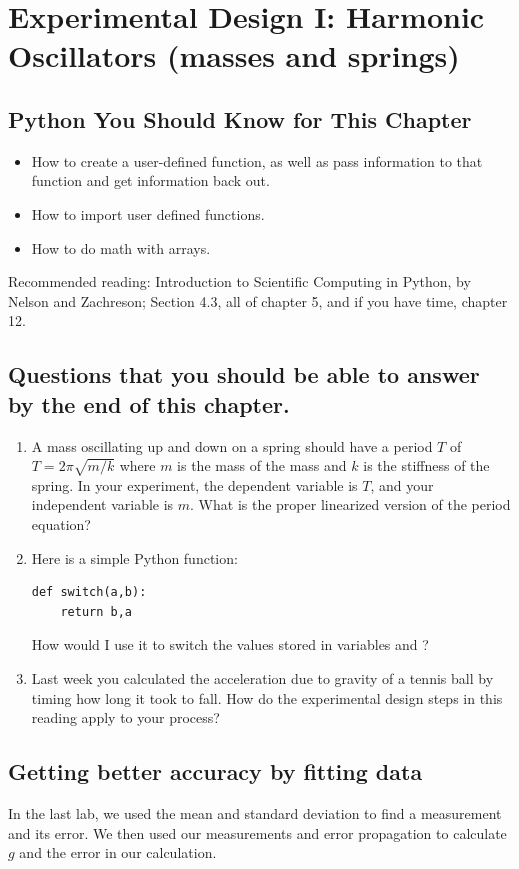 \documentclass[twoside,11pt,ShortChapTitles]{BYUTextbook}
\begin{document}
\chapter[Experimental Design I]{Experimental Design I: Harmonic Oscillators (masses and springs)\label{Experimental Design}}
\section*{Python You Should Know for This Chapter}
\begin{itemize}
\item How to create a user-defined function, as well as pass information to that function and get information back out.
\item How to import user defined functions.
\item How to do math with arrays.
\end{itemize}
Recommended reading: Introduction to Scientific Computing in Python, by Nelson and Zachreson; Section 4.3, all of chapter 5, and if you have time, chapter 12.
\section*{Questions that you should be able to answer by the end of this chapter.}
\begin{enumerate}
\item A mass oscillating up and down on a spring should have a period $T$ of $T=2\pi\sqrt{m/k}$ where $m$ is the mass of the mass and $k$ is the stiffness of the spring.  In your experiment, the dependent variable is $T$, and your independent variable is $m$.  What is the proper linearized version of the period equation?
\item Here is a simple Python function:
\begin{Verbatim}
def switch(a,b):
    return b,a
\end{Verbatim}
How would I use it to switch the values stored in variables  and ?
\item Last week you calculated the acceleration due to gravity of a tennis ball by timing how long it took to fall.  How do the experimental design steps in this reading apply to your process?
\end{enumerate}
\hrulefill


\section{Getting better accuracy by fitting data}
In the last lab, we used the mean and standard deviation to find a measurement and its error.  We then used our measurements and error propagation to calculate $g$ and the error in our calculation.
\end{document}
